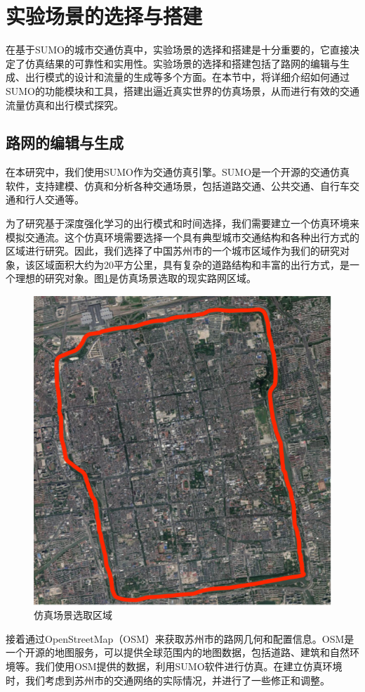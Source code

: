 \section{实验场景的选择与搭建}
\label{section:3.3}

在基于SUMO的城市交通仿真中，实验场景的选择和搭建是十分重要的，它直接决定了仿真结果的可靠性和实用性。实验场景的选择和搭建包括了路网的编辑与生成、出行模式的设计和流量的生成等多个方面。在本节中，将详细介绍如何通过SUMO的功能模块和工具，搭建出逼近真实世界的仿真场景，从而进行有效的交通流量仿真和出行模式探究。

\subsection{路网的编辑与生成}

在本研究中，我们使用SUMO作为交通仿真引擎。SUMO是一个开源的交通仿真软件，支持建模、仿真和分析各种交通场景，包括道路交通、公共交通、自行车交通和行人交通等。

为了研究基于深度强化学习的出行模式和时间选择，我们需要建立一个仿真环境来模拟交通流。这个仿真环境需要选择一个具有典型城市交通结构和各种出行方式的区域进行研究。因此，我们选择了中国苏州市的一个城市区域作为我们的研究对象，该区域面积大约为20平方公里，具有复杂的道路结构和丰富的出行方式，是一个理想的研究对象。图\ref{suzhounet}是仿真场景选取的现实路网区域。

\begin{figure}[H]
  \centering
  \includegraphics[width=.5\linewidth]{figures/content/suzhounet.png}
  \caption{仿真场景选取区域}
  \label{suzhounet}
\end{figure}

接着通过OpenStreetMap（OSM）来获取苏州市的路网几何和配置信息。OSM是一个开源的地图服务，可以提供全球范围内的地图数据，包括道路、建筑和自然环境等。我们使用OSM提供的数据，利用SUMO软件进行仿真。在建立仿真环境时，我们考虑到苏州市的交通网络的实际情况，并进行了一些修正和调整。

